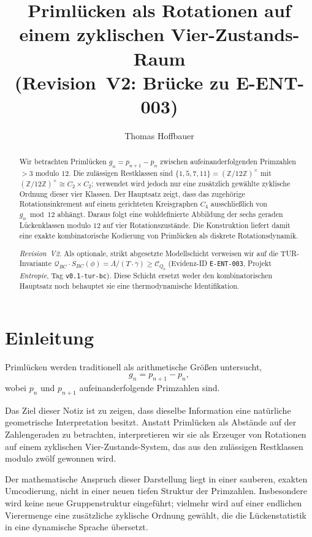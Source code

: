 \documentclass[11pt]{article}
\title{Priml\"ucken als Rotationen auf einem zyklischen Vier-Zustands-Raum\\
\large (Revision~V2: Br\"ucke zu E-ENT-003)}
\author{Thomas Hoffbauer}
\date{}
\theoremstyle{definition}
\begin{document}
\maketitle

\begin{abstract}
Wir betrachten Priml\"ucken $g_n=p_{n+1}-p_n$ zwischen aufeinanderfolgenden Primzahlen $>3$ modulo $12$. Die zul\"assigen Restklassen sind $\{1,5,7,11\}=(\mathbb{Z}/12\mathbb{Z})^\times$ mit $(\mathbb{Z}/12\mathbb{Z})^\times\cong C_2\times C_2$; verwendet wird jedoch nur eine zus\"atzlich gew\"ahlte zyklische Ordnung dieser vier Klassen. Der Hauptsatz zeigt, dass das zugeh\"orige Rotationsinkrement auf einem gerichteten Kreisgraphen $C_4$ ausschlie{\ss}lich von $g_n\bmod 12$ abh\"angt. Daraus folgt eine wohldefinierte Abbildung der sechs geraden L\"uckenklassen modulo $12$ auf vier Rotationszust\"ande. Die Konstruktion liefert damit eine exakte kombinatorische Kodierung von Priml\"ucken als diskrete Rotationsdynamik.

\emph{Revision~V2.} Als optionale, strikt abgesetzte Modellschicht verweisen wir auf die TUR-Invariante
$\mathcal{Q}_{BC}\cdot S_{BC}(\phi)=\Lambda/(T\cdot\gamma)\ge\mathcal{C}_{Q_0}$
(Evidenz-ID \texttt{E-ENT-003}, Projekt \emph{Entropie}, Tag \texttt{v0.1-tur-bc}).
Diese Schicht ersetzt weder den kombinatorischen Hauptsatz noch behauptet sie eine thermodynamische Identifikation.
\end{abstract}

\section{Einleitung}

Priml\"ucken werden traditionell als arithmetische Gr\"o{\ss}en untersucht,
\[
g_n = p_{n+1}-p_n,
\]
wobei $p_n$ und $p_{n+1}$ aufeinanderfolgende Primzahlen sind.

Das Ziel dieser Notiz ist zu zeigen, dass dieselbe Information eine nat\"urliche geometrische Interpretation besitzt.
Anstatt Priml\"ucken als Abst\"ande auf der Zahlengeraden zu betrachten, interpretieren wir sie als Erzeuger von Rotationen auf einem zyklischen Vier-Zustands-System, das aus den zul\"assigen Restklassen modulo zw\"olf gewonnen wird.

Der mathematische Anspruch dieser Darstellung liegt in einer sauberen, exakten Umcodierung, nicht in einer neuen tiefen Struktur der Primzahlen. Insbesondere wird keine neue Gruppenstruktur eingef\"uhrt; vielmehr wird auf einer endlichen Vierermenge eine zus\"atzliche zyklische Ordnung gew\"ahlt, die die L\"uckenstatistik in eine dynamische Sprache \"ubersetzt.
\end{document}
